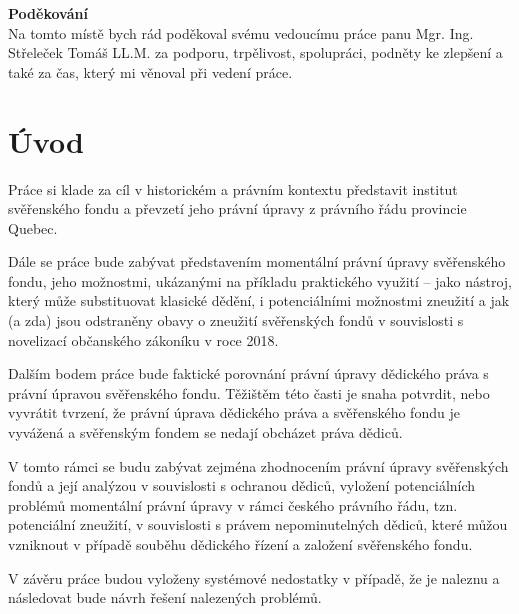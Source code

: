 \documentclass{article}
\begin{document}
\newpage

\vspace*{\fill}
\noindent \textbf{Poděkování} \\

	Na tomto místě bych rád poděkoval svému vedoucímu práce panu Mgr. Ing. 
Střeleček  Tomáš LL.M. za podporu, trpělivost, spolupráci, podněty ke zlepšení a 
také za čas, který mi věnoval při vedení práce.

\vspace*{\fill}
 
\newpage
  \pagestyle{fancy}
  \tableofcontents
  
\newpage
  \pagestyle{fancy}
  
\section{Úvod}

Práce si klade za cíl v historickém a právním kontextu představit institut svěřenského fondu a převzetí jeho právní úpravy z právního řádu provincie Quebec.
\linebreak

\indent Dále se práce bude zabývat představením momentální právní úpravy svěřens\-kého fondu, jeho možnostmi, ukázanými na příkladu praktického využití – jako nástroj, který může substituovat klasické dědění, i potenciálními možnostmi zneužití a jak (a zda) jsou odstraněny obavy o zneužití svěřenských fondů v souvislosti s novelizací občanského zákoníku v roce 2018. 
\linebreak

\indent Dalším bodem práce bude faktické porovnání právní úpravy dědického práva s právní úpravou svěřenského fondu. Těžištěm této časti je snaha potvrdit, nebo vyvrátit tvrzení, že právní úprava dědického práva a svěřenského fondu je vyvážená a svěřenským fondem se nedají obcházet práva dědiců.
\linebreak

\indent V tomto rámci se budu zabývat zejména zhodnocením právní úpravy svěřens\-kých fondů a její analýzou v souvislosti s ochranou dědiců, vyložení potenciálních problémů momentální právní úpravy v rámci českého právního řádu, tzn. potenciální zneužití, v souvislosti s právem nepominutelných dědiců, které můžou vzniknout v případě souběhu dědického řízení a založení svěřenského fondu.
\linebreak

\indent V závěru práce budou vyloženy systémové nedostatky v případě, že je naleznu a následovat bude návrh řešení nalezených problémů.
\end{document}
